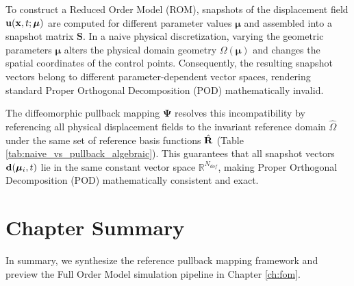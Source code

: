 To construct a Reduced Order Model (ROM), snapshots of the displacement field $\mathbf{u}(\mathbf{x}, t; \boldsymbol{\mu})$ are computed for different parameter values $\boldsymbol{\mu}$ and assembled into a snapshot matrix $\mathbf{S}$. In a naive physical discretization, varying the geometric parameters $\boldsymbol{\mu}$ alters the physical domain geometry $\Omega(\boldsymbol{\mu})$ and changes the spatial coordinates of the control points. Consequently, the resulting snapshot vectors belong to different parameter-dependent vector spaces, rendering standard Proper Orthogonal Decomposition (POD) mathematically invalid. 

The diffeomorphic pullback mapping $\boldsymbol{\Psi}$ resolves this incompatibility by referencing all physical displacement fields to the invariant reference domain $\hat{\Omega}$ under the same set of reference basis functions $\hat{\mathbf{R}}$ (Table \ref{tab:naive_vs_pullback_algebraic}). This guarantees that all snapshot vectors $\mathbf{d}(\boldsymbol{\mu}_i, t)$ lie in the same constant vector space $\mathbb{R}^{N_{dof}}$, making Proper Orthogonal Decomposition (POD) mathematically consistent and exact.

\section{Chapter Summary}

In summary, we synthesize the reference pullback mapping framework and preview the Full Order Model simulation pipeline in Chapter \ref{ch:fom}.

